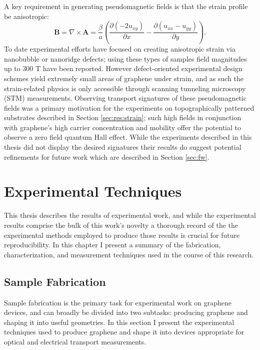 \documentclass[edeposit,fullpage,draftthesis]{uiucthesis2009}
\begin{document}
        A key requirement in generating pseudomagnetic fields is that the strain profile be anisotropic: 
        \begin{equation}
            \textbf{B} = \nabla \times \textbf{A} = \frac{\beta}{a} \left( \frac{\partial (-2 u_{xy})}{\partial x} - \frac{\partial (u_{xx} - u_{yy})}{\partial y} \right).
        \end{equation}
        To date experimental efforts have focused on creating anisotropic strain via nanobubble \cite{Levy2010} 
        or nanoridge \cite{Yan2012} defects; using these types of samples field magnitudes up to 
        300 T have been reported. However defect-oriented experimental design
        schemes yield extremely small areas of graphene under strain, and as such the 
        strain-related physics is only accessible through scanning tunneling microscopy (STM) measurements. 
        Observing transport signatures of these pseudomagnetic fields was 
        a primary motivation for the experiments on topographically patterned substrates 
        described in Section \ref{sec:res:strain}; 
        such high fields in conjunction with graphene's high carrier concentration and mobility
        offer the potential to observe a zero field quantum Hall effect.
        While the experiments described in this thesis did not display the desired signatures their results do 
        suggest potential refinements for future work which are described in Section \ref{sec:fw}.



\chapter{Experimental Techniques}

    This thesis describes the results of experimental work, and while the experimental results comprise the bulk
    of this work's novelty a thorough record of the the experimental methods employed to produce those results 
    is crucial for future reproducibility.
    In this chapter I present a summary of the fabrication, characterization, and measurement techniques used
    in the course of this research.
    
    \section{Sample Fabrication}
    
        Sample fabrication is the primary task for experimental work on graphene devices, 
        and can broadly be divided into two subtasks: producing graphene and shaping it into useful geometries.
        In this section I present the experimental techniques used to produce graphene
        and shape it into devices appropriate for optical and electrical transport measurements.
    
\end{document}
